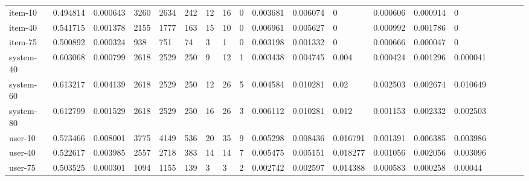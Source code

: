 \begin{table}
{\begin{tabular}{*{19}l}
item-10		&	0.494814 &	0.000643 &	3260 &	2634 &	242 &	12 &	16 &	0 &	0.003681 &	0.006074 &	0 &	0.000606 &	0.000914 &	0 &	 \\
item-40		&	0.541715 &	0.001378 &	2155 &	1777 &	163 &	15 &	10 &	0 &	0.006961 &	0.005627 &	0 &	0.000992 &	0.001786 &	0 &	 \\
item-75		&	0.500892 &	0.000324 &	938 &	751 &	74 &	3  &	1 &	0 &	0.003198 &	0.001332 &	0 &	0.000666 &	0.000047 &	0 &	 \\
system-40	&	0.603068 &	0.000799 &	2618 &	2529 &	250 &	9  &	12 &	1 &	0.003438 &	0.004745 &	0.004 &	0.000424 &	0.001296 &	0.000041 &	 \\
system-60	&	0.613217 &	0.004139 &	2618 &	2529 &	250 &	12 &	26 &	5 &	0.004584 &	0.010281 &	0.02 &	0.002503 &	0.002674 &	0.010649 &	 \\
system-80	&	0.612799 &	0.001529 &	2618 &	2529 &	250 &	16 &	26 &	3 &	0.006112 &	0.010281 &	0.012 &	0.001153 &	0.002332 &	0.002503 &	 \\
user-10		&	0.573466 &	0.008001 &	3775 &	4149 &	536 &	20 &	35 &	9 &	0.005298 &	0.008436 &	0.016791 &	0.001391 &	0.006385 &	0.003986 &	 \\
user-40		&	0.522617 &	0.003985 &	2557 &	2718 &	383 &	14 &	14 &	7 &	0.005475 &	0.005151 &	0.018277 &	0.001056 &	0.002056 &	0.003096 &	 \\
user-75		&	0.503525 &	0.000301 &	1094 &	1155 &	139 &	3 &	3 &	2 &	0.002742 &	0.002597 &	0.014388 &	0.000583 &	0.000258 &	0.00044 &	 \\




\end{tabular}}
\end{table}

